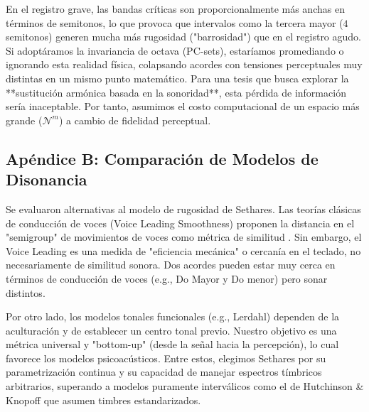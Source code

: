 En el registro grave, las bandas críticas son proporcionalmente más anchas en términos de semitonos, lo que provoca que intervalos como la tercera mayor ($4$ semitonos) generen mucha más rugosidad ("barrosidad") que en el registro agudo. Si adoptáramos la invariancia de octava (PC-sets), estaríamos promediando o ignorando esta realidad física, colapsando acordes con tensiones perceptuales muy distintas en un mismo punto matemático. Para una tesis que busca explorar la **sustitución armónica basada en la sonoridad**, esta pérdida de información sería inaceptable. Por tanto, asumimos el costo computacional de un espacio más grande ($\mathcal{N}^m$) a cambio de fidelidad perceptual.

\subsection{Apéndice B: Comparación de Modelos de Disonancia}
\label{app:rugosidad_detalle}

Se evaluaron alternativas al modelo de rugosidad de Sethares. Las teorías clásicas de conducción de voces (Voice Leading Smoothness) proponen la distancia en el "semigroup" de movimientos de voces como métrica de similitud \cite{tymoczkoGeometryMusicHarmony2011}. Sin embargo, el Voice Leading es una medida de "eficiencia mecánica" o cercanía en el teclado, no necesariamente de similitud sonora. Dos acordes pueden estar muy cerca en términos de conducción de voces (e.g., Do Mayor y Do menor) pero sonar distintos.

Por otro lado, los modelos tonales funcionales (e.g., Lerdahl) dependen de la aculturación y de establecer un centro tonal previo. Nuestro objetivo es una métrica universal y "bottom-up" (desde la señal hacia la percepción), lo cual favorece los modelos psicoacústicos. Entre estos, elegimos Sethares por su parametrización continua y su capacidad de manejar espectros tímbricos arbitrarios, superando a modelos puramente interválicos como el de Hutchinson & Knopoff que asumen timbres estandarizados.



